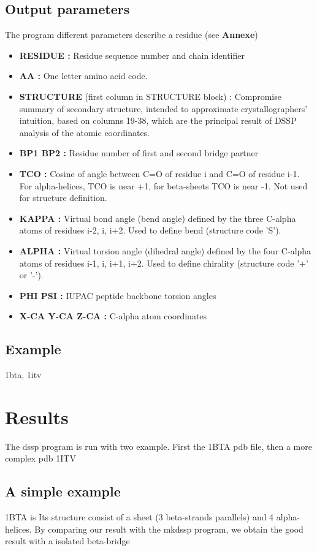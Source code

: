 \documentclass[12pt]{article}
\begin{document}
\subsection{Output parameters}
The program different parameters describe a residue (see \textbf{Annexe})\\
\begin{itemize}
	\item\textbf{RESIDUE :} Residue sequence number and chain identifier
	\item\textbf{AA :} One letter amino acid code.
	\item\textbf{STRUCTURE} (first column in STRUCTURE block) : Compromise summary of secondary structure, intended to approximate crystallographers' intuition, based on columns 19-38, which are the principal result of DSSP analysis of the atomic coordinates.
	\item\textbf{BP1 BP2 :} Residue number of first and second bridge partner
	\item\textbf{TCO :} Cosine of angle between C=O of residue i and C=O of residue i-1. For alpha-helices, TCO is near +1, for beta-sheets TCO is near -1. Not used for structure definition.
	\item\textbf{KAPPA :} Virtual bond angle (bend angle) defined by the three C-alpha atoms of residues i-2, i, i+2. Used to define bend (structure code 'S').
	\item\textbf{ALPHA :} Virtual torsion angle (dihedral angle) defined by the four C-alpha atoms of residues i-1, i, i+1, i+2. Used to define chirality (structure code '+' or '-').
	\item\textbf{PHI PSI :} IUPAC peptide backbone torsion angles
	\item\textbf{X-CA Y-CA Z-CA :} C-alpha atom coordinates
\end{itemize}

\subsection{Example}
1bta, 1itv

\section{Results}
The dssp program is run with two example.
First the 1BTA pdb file, then a more complex pdb 1ITV 

\subsection{A simple example}
1BTA is Its structure consist of a sheet (3 beta-strands parallels) and 4 alpha-helices.
By comparing our result with the mkdssp program, we obtain the good result with a isolated beta-bridge
\end{document}
